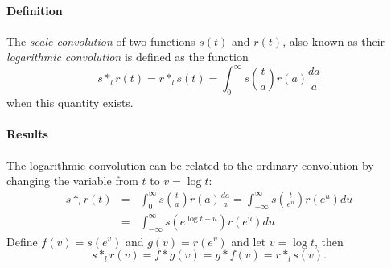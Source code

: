 \documentclass[12pt]{article}
\begin{document}
\paragraph{Definition}

The \emph{scale convolution} of two functions $s(t)$ and $r(t)$, also known as their \emph{logarithmic convolution} is defined as the function 
$$ s \ast_l r(t) = r \ast_l s(t) = \int_0^\infty s(\frac{t}{a})r(a) \frac{da}{a} $$
when this quantity exists.

\paragraph{Results}

The logarithmic convolution can be related to the ordinary convolution by changing the variable from $t$ to $v = \log t$:
\begin{eqnarray*}
s \ast_l r(t) & = & \int_0^\infty s(\frac{t}{a})r(a) \frac{da}{a} = 
                \int_{-\infty}^\infty s(\frac{t}{e^u}) r(e^u) du \\
 & = & \int_{-\infty}^\infty s(e^{\log t - u})r(e^u) du
\end{eqnarray*}
Define $f(v) = s(e^v)$ and $g(v) = r(e^v)$ and let $v = \log t$, then
$$ s \ast_l r(v) = f \ast g(v) = g \ast f(v) = r \ast_l s(v). $$
\end{document}
